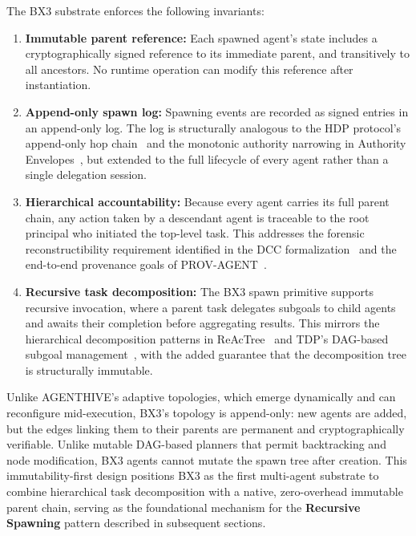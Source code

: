 The BX3 substrate enforces the following invariants:
\begin{enumerate}
    \item \textbf{Immutable parent reference:} Each spawned agent's state includes a cryptographically signed reference to its immediate parent, and transitively to all ancestors. No runtime operation can modify this reference after instantiation.
    \item \textbf{Append-only spawn log:} Spawning events are recorded as signed entries in an append-only log. The log is structurally analogous to the HDP protocol's append-only hop chain~\cite{ietf-hdp-2026} and the monotonic authority narrowing in Authority Envelopes~\cite{capiscIO-rfc008}, but extended to the full lifecycle of every agent rather than a single delegation session.
    \item \textbf{Hierarchical accountability:} Because every agent carries its full parent chain, any action taken by a descendant agent is traceable to the root principal who initiated the top-level task. This addresses the forensic reconstructibility requirement identified in the DCC formalization~\cite{arXiv2604.02767} and the end-to-end provenance goals of PROV-AGENT~\cite{arXiv2508.02866}.
    \item \textbf{Recursive task decomposition:} The BX3 spawn primitive supports recursive invocation, where a parent task delegates subgoals to child agents and awaits their completion before aggregating results. This mirrors the hierarchical decomposition patterns in ReAcTree~\cite{arXiv2511.02424} and TDP's DAG-based subgoal management~\cite{arXiv2601.07577}, with the added guarantee that the decomposition tree is structurally immutable.
\end{enumerate}

Unlike AGENTHIVE's adaptive topologies, which emerge dynamically and can reconfigure mid-execution, BX3's topology is append-only: new agents are added, but the edges linking them to their parents are permanent and cryptographically verifiable. Unlike mutable DAG-based planners that permit backtracking and node modification, BX3 agents cannot mutate the spawn tree after creation. This immutability-first design positions BX3 as the first multi-agent substrate to combine hierarchical task decomposition with a native, zero-overhead immutable parent chain, serving as the foundational mechanism for the \textbf{Recursive Spawning} pattern described in subsequent sections.




